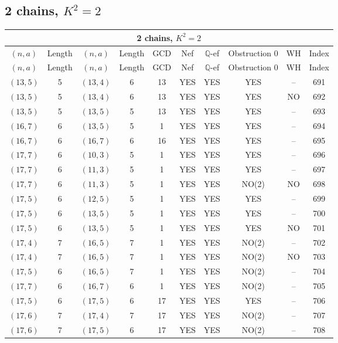 \subsection{2 chains, \(K^2 = 2\)}
\begin{longtable}{|c|c|c|c|c|c|c|c|c|c|}
\hline
\multicolumn{10}{|c|}{2 chains, $K^2 = 2$}\\
\hline
$(n,a)$ & Length & $(n,a)$ & Length & GCD & Nef & $\mathbb Q$-ef & Obstruction 0 & WH & Index\\
\hline
\endfirsthead

\hline
$(n,a)$ & Length & $(n,a)$ & Length & GCD & Nef & $\mathbb Q$-ef & Obstruction 0 & WH & Index\\
\hline
\endhead
\hline
\endfoot

$(13, 5)$ & 5 & $(13, 4)$ & 6 & 13 & YES & YES & YES & -- & 691\\
$(13, 5)$ & 5 & $(13, 4)$ & 6 & 13 & YES & YES & YES & NO & 692\\
$(13, 5)$ & 5 & $(13, 5)$ & 5 & 13 & YES & YES & YES & -- & 693\\
$(16, 7)$ & 6 & $(13, 5)$ & 5 & 1 & YES & YES & YES & -- & 694\\
$(16, 7)$ & 6 & $(16, 7)$ & 6 & 16 & YES & YES & YES & -- & 695\\
$(17, 7)$ & 6 & $(10, 3)$ & 5 & 1 & YES & YES & YES & -- & 696\\
$(17, 7)$ & 6 & $(11, 3)$ & 5 & 1 & YES & YES & YES & -- & 697\\
$(17, 7)$ & 6 & $(11, 3)$ & 5 & 1 & YES & YES & NO(2) & NO & 698\\
$(17, 5)$ & 6 & $(12, 5)$ & 5 & 1 & YES & YES & YES & -- & 699\\
$(17, 5)$ & 6 & $(13, 5)$ & 5 & 1 & YES & YES & YES & -- & 700\\
$(17, 5)$ & 6 & $(13, 5)$ & 5 & 1 & YES & YES & YES & NO & 701\\
$(17, 4)$ & 7 & $(16, 5)$ & 7 & 1 & YES & YES & NO(2) & -- & 702\\
$(17, 4)$ & 7 & $(16, 5)$ & 7 & 1 & YES & YES & NO(2) & NO & 703\\
$(17, 5)$ & 6 & $(16, 5)$ & 7 & 1 & YES & YES & NO(2) & -- & 704\\
$(17, 7)$ & 6 & $(16, 7)$ & 6 & 1 & YES & YES & NO(2) & -- & 705\\
$(17, 5)$ & 6 & $(17, 5)$ & 6 & 17 & YES & YES & YES & -- & 706\\
$(17, 6)$ & 7 & $(17, 4)$ & 7 & 17 & YES & YES & NO(2) & -- & 707\\
$(17, 6)$ & 7 & $(17, 5)$ & 6 & 17 & YES & YES & NO(2) & -- & 708\\

\end{longtable}

